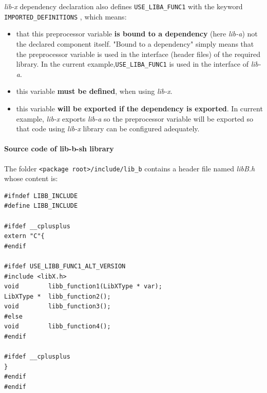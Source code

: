 \documentclass[12pt,a4paper]{article}
\begin{document}
\textit{lib-x} dependency declaration also defines \texttt{USE\_LIBA\_FUNC1} with the keyword \texttt{IMPORTED\_DEFINITIONS} , which means:
\begin{itemize}
\item that this preprocessor variable \textbf{is bound to a dependency} (here \textit{lib-a}) not the declared component itself. "Bound to a dependency" simply means that the preprocessor variable is used in the interface (header files) of the required library. In the current example,\texttt{USE\_LIBA\_FUNC1} is used in the interface of \textit{lib-a}. 
\item this variable \textbf{must be defined}, when using \textit{lib-x}.
\item this variable \textbf{will be exported if the dependency is exported}. In current example, \textit{lib-x} exports \textit{lib-a} so the preprocessor variable will be exported so that code using \textit{lib-x} library can be configured adequately.
\end{itemize}

\paragraph{Source code of lib-b-sh library}

The folder \texttt{<package root>/include/lib\_b} contains a header file named \textit{libB.h} whose content is: 
\begin{verbatim}
#ifndef LIBB_INCLUDE
#define LIBB_INCLUDE

#ifdef __cplusplus
extern "C"{
#endif

#ifdef USE_LIBB_FUNC1_ALT_VERSION
#include <libX.h>
void        libb_function1(LibXType * var);
LibXType *  libb_function2();
void        libb_function3();
#else
void        libb_function4();
#endif

#ifdef __cplusplus
}
#endif
#endif
\end{verbatim}
\end{document}

